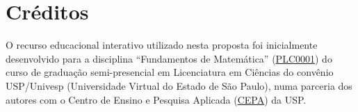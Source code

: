 \documentclass[a4paper,12pt]{scrartcl}
\begin{document}
  \section*{Créditos}
  
  O recurso educacional interativo utilizado nesta proposta foi inicialmente desenvolvido para a disciplina ``Fundamentos de Matemática'' (\href{https://uspdigital.usp.br/jupiterweb/obterDisciplina?sgldis=plc0001&nomdis=}{PLC0001}) do curso de graduação semi-presencial em Licenciatura em Ciências do convênio USP/Univesp (Universidade Virtual do Estado de São Paulo), numa parceria dos autores com o Centro de Ensino e Pesquisa Aplicada (\href{http://cepa.if.usp.br}{CEPA}) da USP.
\end{document}

